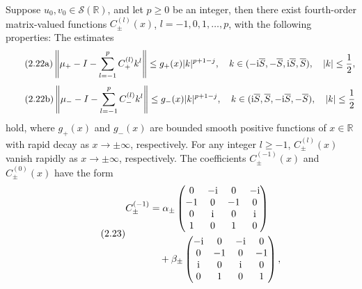 \begin{paperpropositionen}\label{prop:2.3}
Suppose $u_0,v_0\in\mathcal S(\mathbb R)$, and let $p\ge0$ be an integer, then there exist fourth-order matrix-valued functions $C_\pm^{(l)}(x)$, $l=-1,0,1,\ldots,p$, with the following properties: The estimates
\begin{equation}
\originaleq{2.22a}
\left\|\mu_+-I-\sum\limits_{l=-1}^p C_+^{(l)}k^l\right\|
\le g_+(x)|k|^{p+1-j},\quad
k\in(-\ii\overline S,-\overline S,\ii\overline S,\overline S),\quad |k|\le\dfrac{1}{2},
\end{equation}
\begin{equation}
\originaleq{2.22b}
\left\|\mu_--I-\sum\limits_{l=-1}^p C_-^{(l)}k^l\right\|
\le g_-(x)|k|^{p+1-j},\quad
k\in(\ii\overline S,\overline S,-\ii\overline S,-\overline S),\quad |k|\le\dfrac{1}{2}
\end{equation}
hold, where $g_+(x)$ and $g_-(x)$ are bounded smooth positive functions of $x\in\mathbb R$ with rapid decay as $x\to\pm\infty$, respectively.
For any integer $l\ge-1$, $C_\pm^{(l)}(x)$ vanish rapidly as $x\to\pm\infty$, respectively.
The coefficients $C_\pm^{(-1)}(x)$ and $C_\pm^{(0)}(x)$ have the form
\begin{equation}
\originaleq{2.23}
\begin{aligned}
C_\pm^{(-1)}
&=\alpha_\pm\begin{pmatrix}
0&-\ii&0&-\ii\\-1&0&-1&0\\0&\ii&0&\ii\\1&0&1&0
\end{pmatrix}\\
&\quad+\beta_\pm\begin{pmatrix}
-\ii&0&-\ii&0\\0&-1&0&-1\\\ii&0&\ii&0\\0&1&0&1
\end{pmatrix},
\end{aligned}
\end{equation}

\end{paperpropositionen}
